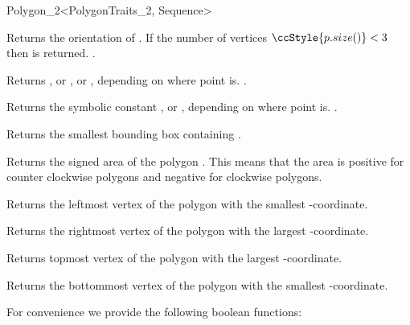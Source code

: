 \begin{ccRefClass}{Polygon_2<PolygonTraits_2, Sequence>}
{{  
    { Returns the orientation of \ccVar. If the number of vertices 
      $\ccStyle{p.size()} < 3$ then  is returned.
      \ccPrecond {}.
    }

    { Returns , or ,
       or , 
       depending on where point  is.
      \ccPrecond {}.
    }

    { Returns the symbolic constant , 
      or , depending on where point
       is.
      \ccPrecond {}.
    }

    { Returns the smallest bounding box containing \ccVar.}
    
    { Returns the signed area of the polygon \ccVar. This means that the area is
      positive for counter clockwise polygons and negative for clockwise polygons.
    }
      
    { Returns the leftmost vertex of the polygon  with the smallest
     -coordinate. }
    
    { Returns the rightmost vertex of the polygon  with the largest
     -coordinate. }
    
    { Returns topmost vertex of the polygon  with the largest
     -coordinate. }
    
    { Returns the bottommost vertex of the polygon  with the smallest
     -coordinate. }
    
\newpage
For convenience we provide the following boolean functions:    

    {}

\ccGlue
{}
    {}

\ccGlue
{}
    {}

}}
\end{ccRefClass}
